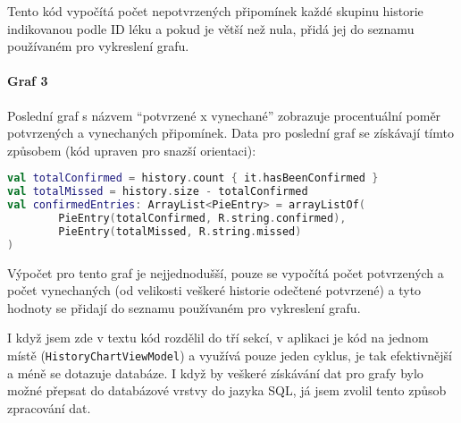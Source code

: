 \documentclass[../TakeYourPill.tex]{subfiles}
\begin{document}
Tento kód vypočítá počet nepotvrzených připomínek každé skupinu historie indikovanou podle ID léku a pokud je větší než nula, přidá jej do seznamu používaném pro vykreslení grafu.


\paragraph{Graf 3} Poslední graf s názvem \enquote{potvrzené x vynechané} zobrazuje procentuální poměr potvrzených a vynechaných připomínek. Data pro poslední graf se získávají tímto způsobem (kód upraven pro snazší orientaci):

\begin{lstlisting}[language=Kotlin]
val totalConfirmed = history.count { it.hasBeenConfirmed }
val totalMissed = history.size - totalConfirmed
val confirmedEntries: ArrayList<PieEntry> = arrayListOf(
        PieEntry(totalConfirmed, R.string.confirmed),
        PieEntry(totalMissed, R.string.missed)
)
\end{lstlisting}

Výpočet pro tento graf je nejjednodušší, pouze se vypočítá počet potvrzených a počet vynechaných (od velikosti veškeré historie odečtené potvrzené) a tyto hodnoty se přidají do seznamu používaném pro vykreslení grafu.

I když jsem zde v textu kód rozdělil do tří sekcí, v aplikaci je kód na jednom místě (\texttt{HistoryChartViewModel}) a využívá pouze jeden cyklus, je tak efektivnější a méně se dotazuje databáze. I když by veškeré získávání dat pro grafy bylo možné přepsat do databázové vrstvy do jazyka SQL, já jsem zvolil tento způsob zpracování dat.
\end{document}
